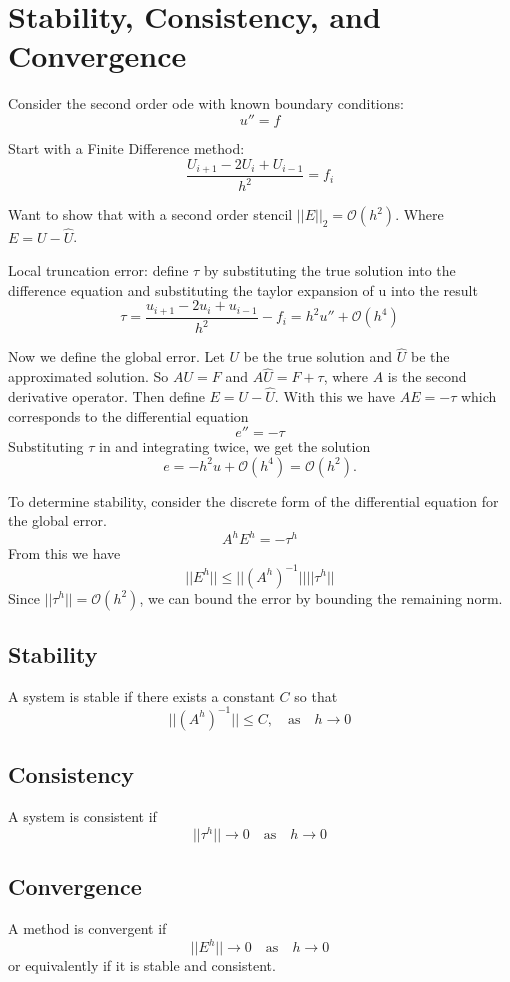 \documentclass[12pt,a4paper,twoside]{article}
\begin{document}
\section{Stability, Consistency, and Convergence}
Consider the second order ode with known boundary conditions: $$u''=f$$%

Start with a Finite Difference method: $$\frac{U_{i+1}-2U_i+U_{i-1}}{h^2} = f_i$$

Want to show that with a second order stencil $||E||_2 = \mathcal{O}(h^2)$. Where $E = U - \hat{U}$.

Local truncation error: define $\tau$ by substituting the true solution into the difference equation and substituting the taylor expansion of u into the result
$$\tau = \frac{u_{i+1}-2u_i+u_{i-1}}{h^2} - f_i = h^2u''+\mathcal{O}(h^4)$$

Now we define the global error. Let $U$ be the true solution and $\hat{U}$ be the approximated solution. So $AU=F$ and $A\hat{U}=F+\tau$, where $A$ is the second derivative operator. Then define $E=U-\hat{U}$. With this we have $AE=-\tau$ which corresponds to the differential equation $$e''=-\tau$$Substituting $\tau$ in and integrating twice, we get the solution $$e=-h^2u+\mathcal{O}(h^4)=\mathcal{O}(h^2).$$

To determine stability, consider the discrete form of the differential equation for the global error. $$A^hE^h=-\tau^h$$
From this we have
$$||E^h|| \leq ||(A^h)^{-1}||||\tau^h||$$
Since $||\tau^h|| = \mathcal{O}(h^2)$, we can bound the error by bounding the remaining norm. 

\subsection{Stability}
A system is stable if there exists a constant $C$ so that $$||(A^h)^{-1}|| \leq C,\quad \text{as}\quad h\to 0$$

\subsection{Consistency}
A system is consistent if $$||\tau^h||\to 0 \quad \text{as} \quad h\to 0$$

\subsection{Convergence}
A method is convergent if $$||E^h|| \to 0 \quad \text{as} \quad h\to 0$$
or equivalently if it is stable and consistent.
\end{document}

